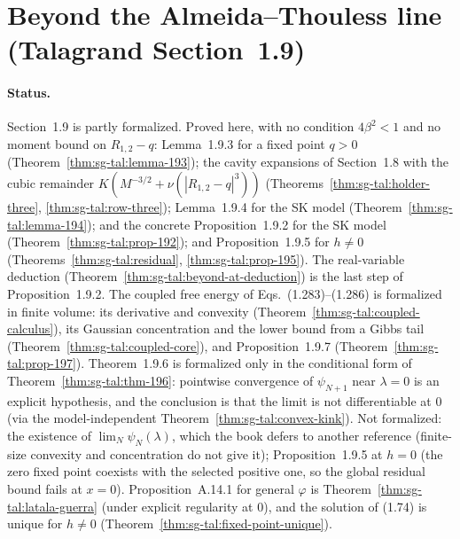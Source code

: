 \section{Beyond the Almeida--Thouless line (Talagrand Section~1.9)}
\label{sec:sg-tal:beyond-at}

\paragraph{Status.}
Section~1.9 is partly formalized.  Proved here, with no condition $4\beta^2<1$ and no moment bound on $R_{1,2}-q$:
Lemma~1.9.3 for a fixed point $q>0$ (Theorem~\ref{thm:sg-tal:lemma-193}); the cavity expansions of Section~1.8 with the
cubic remainder $K(M^{-3/2}+\nu(|R_{1,2}-q|^3))$ (Theorems~\ref{thm:sg-tal:holder-three}, \ref{thm:sg-tal:row-three});
Lemma~1.9.4 for the SK model (Theorem~\ref{thm:sg-tal:lemma-194}); and the concrete Proposition~1.9.2 for the SK model
(Theorem~\ref{thm:sg-tal:prop-192}); and Proposition~1.9.5 for $h\ne0$ (Theorems~\ref{thm:sg-tal:residual}, \ref{thm:sg-tal:prop-195}).
The real-variable deduction (Theorem~\ref{thm:sg-tal:beyond-at-deduction}) is the last step of Proposition~1.9.2.
The coupled free energy of Eqs.~(1.283)--(1.286) is formalized in finite volume: its derivative and convexity
(Theorem~\ref{thm:sg-tal:coupled-calculus}), its Gaussian concentration and the lower bound from a Gibbs tail
(Theorem~\ref{thm:sg-tal:coupled-core}), and Proposition~1.9.7 (Theorem~\ref{thm:sg-tal:prop-197}).
Theorem~1.9.6 is formalized only in the conditional form of Theorem~\ref{thm:sg-tal:thm-196}: pointwise convergence of
$\psi_{N+1}$ near $\lambda=0$ is an explicit hypothesis, and the conclusion is that the limit is not differentiable at $0$
(via the model-independent Theorem~\ref{thm:sg-tal:convex-kink}).
Not formalized: the existence of $\lim_N\psi_N(\lambda)$, which the book defers to another reference (finite-size convexity and concentration do not
give it); Proposition~1.9.5 at $h=0$ (the zero fixed point coexists with the selected positive one, so the global residual
bound fails at $x=0$). Proposition~A.14.1 for general $\varphi$ is Theorem~\ref{thm:sg-tal:latala-guerra} (under explicit regularity at $0$), and the solution of (1.74) is unique for $h\ne0$ (Theorem~\ref{thm:sg-tal:fixed-point-unique}).

